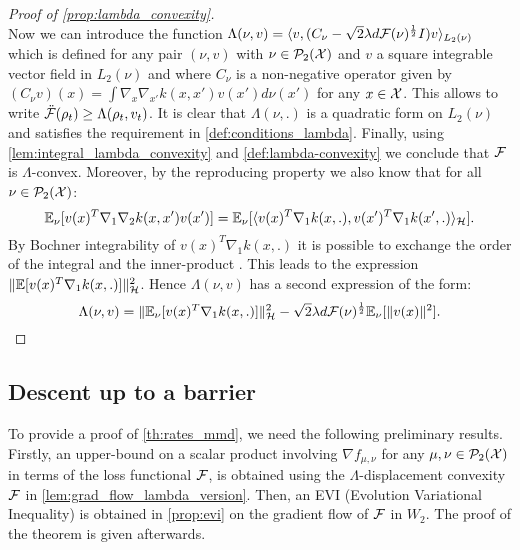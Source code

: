 \begin{proof}[Proof of \cref{prop:lambda_convexity}]
\[\]
Now we can introduce the function $\Lambda(\nu,v) = \langle v ,( C_{\nu} -\sqrt{2}\lambda d {{\mathcal F}}(\nu)^{\frac{1}{2}} I) v \rangle_{L_2(\nu)}$
which is defined for any pair $(\nu,v)$ with  $\nu\in \mathcal{P}_2({{\mathcal X}})$ and $v$ a square integrable vector field in $L_2(\nu)$ and where $C_{\nu}$ is a non-negative operator given by  $(C_{\nu}v)(x)=\int\nabla_{x}\nabla_{x'}k(x,x')v(x')d\nu(x')$ for any $x \in {{\mathcal X}}$.
This allows to write $\ddot{{{\mathcal F}}}(\rho_t) \geq \Lambda(\rho_t,v_t)$.
It is clear that $\Lambda(\nu,.)$  is a quadratic form on $L_2(\nu)$ and satisfies the requirement in \cref{def:conditions_lambda}.
Finally, using \cref{lem:integral_lambda_convexity} and \cref{def:lambda-convexity} we conclude that ${{\mathcal F}}$ is $\Lambda$-convex. Moreover, by the reproducing property we also know that for all $\nu \in \mathcal{P}_2({{\mathcal X}})$:
\[ \mathbb{E}_{\nu}[ v(x)^T \nabla_1 \nabla_2 k(x,x') v(x') ]   = \mathbb{E}_{\nu}[\langle  v(x)^T \nabla_1 k(x,.),  v(x')^T \nabla_1k(x',.) \rangle_{{{\mathcal H}}}].
\] 
By Bochner integrability of $v(x)^T \nabla_1 k(x,.)$ it is possible to exchange the order of the integral and the inner-product \cite[Theorem 6]{Retherford:1978}. This leads to the expression $\Vert \mathbb{E}[v(x)^T \nabla_1 k(x,.)]\Vert^2_{{{\mathcal H}}}$. Hence $\Lambda(\nu,v)$ has a second expression of the form:
\[
\Lambda(\nu,v) = \Vert \mathbb{E}_{\nu}[v(x)^T \nabla_1 k(x,.)]\Vert^2_{{{\mathcal H}}} - \sqrt{2}\lambda d {{\mathcal F}}(\nu)^{\frac{1}{2}}\mathbb{E}_{\nu}[\Vert v(x)\Vert^2 ].
\]
\end{proof}


\subsection{Descent up to a barrier}

To provide a proof of \cref{th:rates_mmd}, we need the following preliminary results. Firstly, an upper-bound on a scalar product involving $\nabla f_{\mu, \nu}$ for any $\mu, \nu \in \mathcal{P}_2({{\mathcal X}})$ in terms of the loss functional ${{\mathcal F}}$, is obtained using the $\Lambda$-displacement convexity ${{\mathcal F}}$ in \cref{lem:grad_flow_lambda_version}. Then, an EVI (Evolution Variational Inequality) is obtained in \cref{prop:evi} on the gradient flow of ${{\mathcal F}}$ in $W_2$. The proof of the theorem is given afterwards.



